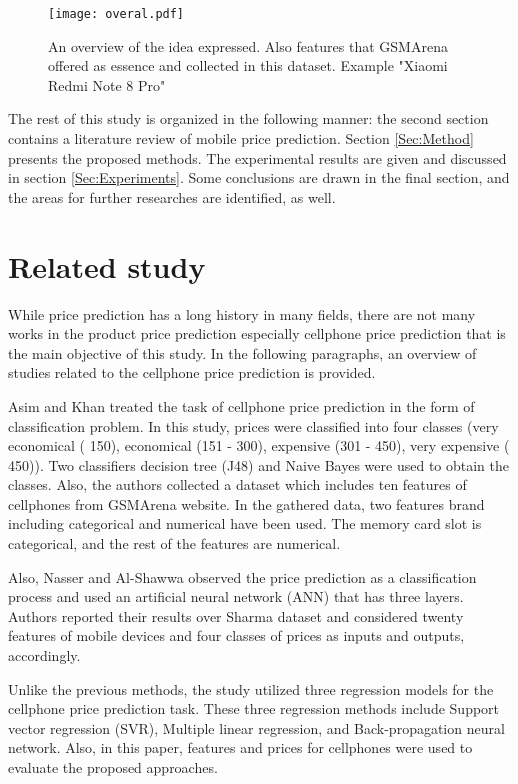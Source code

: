 \documentclass{svjour3}                     \smartqed  \usepackage{graphicx}
\begin{document}
\begin{figure*}
	\centering
	\texttt{[image: overal.pdf]}
	\caption{An overview of the idea expressed. Also features that GSMArena offered as essence and collected in this dataset. Example "Xiaomi Redmi Note 8 Pro"}
	\label{Fig:Overal}
\end{figure*}

The rest of this study is organized in the following manner: the second section contains a literature review of mobile price prediction. Section \ref{Sec:Method} presents the proposed methods. The experimental results are given and discussed in section \ref{Sec:Experiments}. Some conclusions are drawn in the final section, and the areas for further researches are identified, as well.

\section{Related study} \label{Sec:Related-study}
While price prediction has a long history in many fields, there are not many works in the product price prediction especially cellphone price prediction that is the main objective of this study. In the following paragraphs, an overview of studies related to the cellphone price prediction is provided. 

Asim  and  Khan \cite{Asim2018} treated the task of cellphone price prediction in the form of classification problem. In this study, prices were classified into four classes (very economical ( 150), economical (151 - 300), expensive (301 - 450), very expensive ( 450)). Two classifiers decision tree (J48) and Naive Bayes were used to obtain the classes. Also, the authors collected a dataset which includes ten features of  cellphones from GSMArena website. In the gathered data, two features brand including categorical and numerical have been used. The memory card slot is categorical, and the rest of the features are numerical.

Also, Nasser and Al-Shawwa \cite{Nasser2019} observed the price prediction as a classification process and used an artificial neural network (ANN) that has three layers. Authors reported their results over Sharma  \cite{Sharma} dataset and considered twenty features of mobile devices and four classes of prices as inputs and outputs, accordingly.  

Unlike the previous methods, the study \cite{Chandrashekhara2019} utilized three regression models for the cellphone price prediction task. These three regression methods include Support vector regression (SVR), Multiple linear regression, and Back-propagation neural network. Also, in this paper,  features and prices for  cellphones were used to evaluate the proposed approaches.
\end{document}
